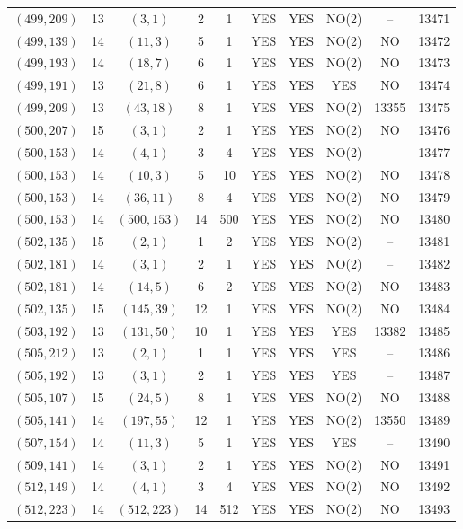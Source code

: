 \begin{longtable}{|c|c|c|c|c|c|c|c|c|c|}
$(499, 209)$ & 13 & $(3, 1)$ & 2 & 1 & YES & YES & NO(2) & -- & 13471\\
$(499, 139)$ & 14 & $(11, 3)$ & 5 & 1 & YES & YES & NO(2) & NO & 13472\\
$(499, 193)$ & 14 & $(18, 7)$ & 6 & 1 & YES & YES & NO(2) & NO & 13473\\
$(499, 191)$ & 13 & $(21, 8)$ & 6 & 1 & YES & YES & YES & NO & 13474\\
$(499, 209)$ & 13 & $(43, 18)$ & 8 & 1 & YES & YES & NO(2) & 13355 & 13475\\
$(500, 207)$ & 15 & $(3, 1)$ & 2 & 1 & YES & YES & NO(2) & NO & 13476\\
$(500, 153)$ & 14 & $(4, 1)$ & 3 & 4 & YES & YES & NO(2) & -- & 13477\\
$(500, 153)$ & 14 & $(10, 3)$ & 5 & 10 & YES & YES & NO(2) & NO & 13478\\
$(500, 153)$ & 14 & $(36, 11)$ & 8 & 4 & YES & YES & NO(2) & NO & 13479\\
$(500, 153)$ & 14 & $(500, 153)$ & 14 & 500 & YES & YES & NO(2) & NO & 13480\\
$(502, 135)$ & 15 & $(2, 1)$ & 1 & 2 & YES & YES & NO(2) & -- & 13481\\
$(502, 181)$ & 14 & $(3, 1)$ & 2 & 1 & YES & YES & NO(2) & -- & 13482\\
$(502, 181)$ & 14 & $(14, 5)$ & 6 & 2 & YES & YES & NO(2) & NO & 13483\\
$(502, 135)$ & 15 & $(145, 39)$ & 12 & 1 & YES & YES & NO(2) & NO & 13484\\
$(503, 192)$ & 13 & $(131, 50)$ & 10 & 1 & YES & YES & YES & 13382 & 13485\\
$(505, 212)$ & 13 & $(2, 1)$ & 1 & 1 & YES & YES & YES & -- & 13486\\
$(505, 192)$ & 13 & $(3, 1)$ & 2 & 1 & YES & YES & YES & -- & 13487\\
$(505, 107)$ & 15 & $(24, 5)$ & 8 & 1 & YES & YES & NO(2) & NO & 13488\\
$(505, 141)$ & 14 & $(197, 55)$ & 12 & 1 & YES & YES & NO(2) & 13550 & 13489\\
$(507, 154)$ & 14 & $(11, 3)$ & 5 & 1 & YES & YES & YES & -- & 13490\\
$(509, 141)$ & 14 & $(3, 1)$ & 2 & 1 & YES & YES & NO(2) & NO & 13491\\
$(512, 149)$ & 14 & $(4, 1)$ & 3 & 4 & YES & YES & NO(2) & NO & 13492\\
$(512, 223)$ & 14 & $(512, 223)$ & 14 & 512 & YES & YES & NO(2) & NO & 13493\\

\end{longtable}
